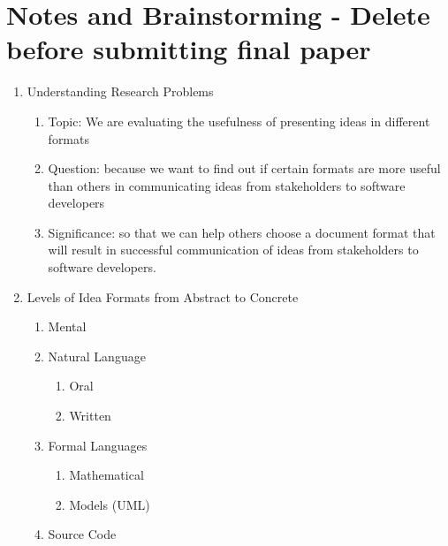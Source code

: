 \documentclass{acm_proc_article-sp}
\begin{document}
\section{Notes and Brainstorming - Delete before submitting final paper}
\begin{enumerate}
	\item Understanding Research Problems
	\begin{enumerate}
		\item Topic: We are evaluating the usefulness of presenting ideas in different formats 
		\item Question: because we want to find out if certain formats are more useful than others in communicating ideas from stakeholders to software developers
		\item Significance: so that we can help others choose a document format that will result in successful communication of ideas from stakeholders to software developers. 
	\end{enumerate}
	\item Levels of Idea Formats from Abstract to Concrete
	\begin{enumerate}
		\item Mental
		\item Natural Language
		\begin{enumerate}
			\item Oral
			\item Written
		\end{enumerate}
			
		\item Formal Languages
		\begin{enumerate}
			\item Mathematical
			\item Models (UML)
		\end{enumerate}
		\item Source Code
	\end{enumerate}
\end{enumerate}

 
%

%
%

\balancecolumns
\end{document}
